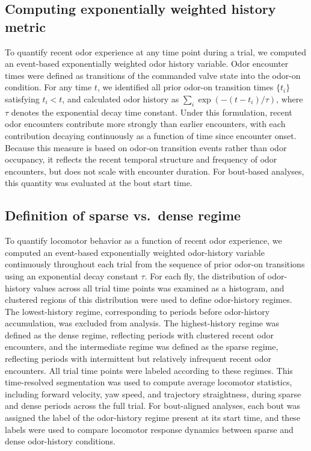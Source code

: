 \subsection{Computing exponentially weighted history metric}

To quantify recent odor experience at any time point during a trial, we computed an event-based exponentially weighted odor history variable. Odor encounter times were defined as transitions of the commanded valve state into the odor-on condition. For any time $t$, we identified all prior odor-on transition times $\{t_i\}$ satisfying $t_i < t$, and calculated odor history as $\sum_i \exp(-(t - t_i)/\tau)$, where $\tau$ denotes the exponential decay time constant. Under this formulation, recent odor encounters contribute more strongly than earlier encounters, with each contribution decaying continuously as a function of time since encounter onset. Because this measure is based on odor-on transition events rather than odor occupancy, it reflects the recent temporal structure and frequency of odor encounters, but does not scale with encounter duration. For bout-based analyses, this quantity was evaluated at the bout start time.

\subsection{Definition of sparse vs.\ dense regime}

To quantify locomotor behavior as a function of recent odor experience, we computed an event-based exponentially weighted odor-history variable continuously throughout each trial from the sequence of prior odor-on transitions using an exponential decay constant $\tau$. For each fly, the distribution of odor-history values across all trial time points was examined as a histogram, and clustered regions of this distribution were used to define odor-history regimes. The lowest-history regime, corresponding to periods before odor-history accumulation, was excluded from analysis. The highest-history regime was defined as the dense regime, reflecting periods with clustered recent odor encounters, and the intermediate regime was defined as the sparse regime, reflecting periods with intermittent but relatively infrequent recent odor encounters. All trial time points were labeled according to these regimes. This time-resolved segmentation was used to compute average locomotor statistics, including forward velocity, yaw speed, and trajectory straightness, during sparse and dense periods across the full trial. For bout-aligned analyses, each bout was assigned the label of the odor-history regime present at its start time, and these labels were used to compare locomotor response dynamics between sparse and dense odor-history conditions.

